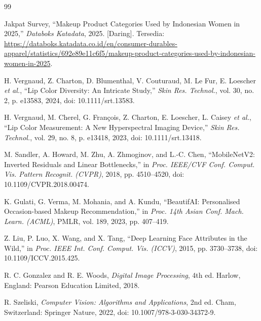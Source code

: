 \documentclass[10pt,a4paper]{article}
\begin{document}
\begingroup
\renewcommand{\section}[2]{}%
\begin{thebibliography}{99}
\fontsize{8pt}{10pt}\selectfont
\setlength{\itemsep}{1pt}
\setlength{\parskip}{0pt}

Jakpat Survey, ``Makeup Product Categories Used by Indonesian Women in 2025,'' \textit{Databoks Katadata}, 2025. [Daring]. Tersedia: \url{https://databoks.katadata.co.id/en/consumer-durables-apparel/statistics/692e89e11c6f5/makeup-product-categories-used-by-indonesian-women-in-2025}.

H. Vergnaud, Z. Charton, D. Blumenthal, V. Couturaud, M. Le Fur, E. Loescher \textit{et al.}, ``Lip Color Diversity: An Intricate Study,'' \textit{Skin Res. Technol.}, vol. 30, no. 2, p. e13583, 2024, doi: 10.1111/srt.13583.

H. Vergnaud, M. Cherel, G. Fran\c{c}ois, Z. Charton, E. Loescher, L. Caisey \textit{et al.}, ``Lip Color Measurement: A New Hyperspectral Imaging Device,'' \textit{Skin Res. Technol.}, vol. 29, no. 8, p. e13418, 2023, doi: 10.1111/srt.13418.

M. Sandler, A. Howard, M. Zhu, A. Zhmoginov, and L.-C. Chen, ``MobileNetV2: Inverted Residuals and Linear Bottlenecks,'' in \textit{Proc. IEEE/CVF Conf. Comput. Vis. Pattern Recognit. (CVPR)}, 2018, pp. 4510--4520, doi: 10.1109/CVPR.2018.00474.

K. Gulati, G. Verma, M. Mohania, and A. Kundu, ``BeautifAI: Personalised Occasion-based Makeup Recommendation,'' in \textit{Proc. 14th Asian Conf. Mach. Learn. (ACML)}, PMLR, vol. 189, 2023, pp. 407--419.

Z. Liu, P. Luo, X. Wang, and X. Tang, ``Deep Learning Face Attributes in the Wild,'' in \textit{Proc. IEEE Int. Conf. Comput. Vis. (ICCV)}, 2015, pp. 3730--3738, doi: 10.1109/ICCV.2015.425.

R. C. Gonzalez and R. E. Woods, \textit{Digital Image Processing}, 4th ed. Harlow, England: Pearson Education Limited, 2018.

R. Szeliski, \textit{Computer Vision: Algorithms and Applications}, 2nd ed. Cham, Switzerland: Springer Nature, 2022, doi: 10.1007/978-3-030-34372-9.


\end{thebibliography}
\end{document}
